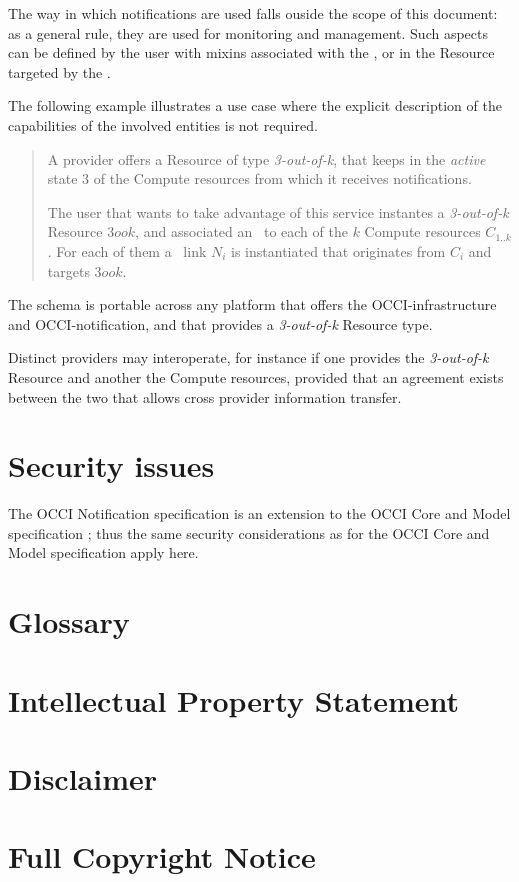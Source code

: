 \documentclass[10pt,a4paper]{article}
\begin{document}
The way in which notifications are used falls ouside the scope of this document: as a general rule, they are used for monitoring and management. Such aspects can be defined by the user with mixins associated with the \ntfl, or in the Resource targeted by the \ntfl.

The following example illustrates a use case where the explicit description of the capabilities of the involved entities is not required.

\begin{quote}
A provider offers a Resource of type {\em 3-out-of-k}, that keeps in the {\em active} state 3 of the Compute resources from which it receives notifications.

The user that wants to take advantage of this service instantes a {\em 3-out-of-k} Resource $3ook$, and associated an \smx\ to each of the $k$ Compute resources $C_{1..k}$. For each of them a \ntfl\ link $N_i$ is instantiated that originates from $C_i$ and targets $3ook$.
\end{quote}

The schema is portable across any platform that offers the OCCI-infrastructure and OCCI-notification, and that provides a  {\em 3-out-of-k} Resource type.

Distinct providers may interoperate, for instance if one provides the  {\em 3-out-of-k} Resource and another the Compute resources, provided that an agreement exists between the two that allows cross provider information transfer.

\section{Security issues}
The OCCI Notification specification is an extension to the OCCI Core
and Model specification \cite{occi:core}; thus the same security
considerations as for the OCCI Core and Model specification apply
here.

\section{Glossary}
\label{sec:glossary}

 
%

\section{Intellectual Property Statement}


\section{Disclaimer}


\section{Full Copyright Notice}




\end{document}
